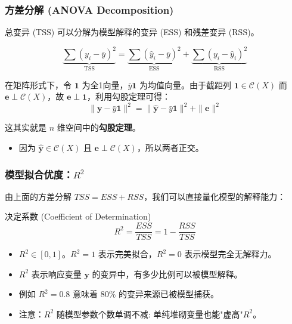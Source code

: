 
\begin{frame}
\frametitle{方差分解 (ANOVA Decomposition)}

总变异 (TSS) 可以分解为模型解释的变异 (ESS) 和残差变异 (RSS)。

\[
\underbrace{\sum (y_i - \bar{y})^2}_{\text{TSS}} = \underbrace{\sum (\hat{y}_i - \bar{y})^2}_{\text{ESS}} + \underbrace{\sum (y_i - \hat{y}_i)^2}_{\text{RSS}}
\]

在矩阵形式下，令 $\mathbf{1}$ 为全1向量，$\bar{y}\mathbf{1}$ 为均值向量。由于截距列 $\mathbf{1} \in \mathcal{C}(X)$ 而 $\mathbf{e} \perp \mathcal{C}(X)$，故 $\mathbf{e} \perp \mathbf{1}$，利用勾股定理可得：
\[
\|\mathbf{y} - \bar{y}\mathbf{1}\|^2 = \|\hat{\mathbf{y}} - \bar{y}\mathbf{1}\|^2 + \|\mathbf{e}\|^2
\]

这其实就是 $n$ 维空间中的\textbf{勾股定理}。
\begin{itemize}
    \item 因为 $\hat{\mathbf{y}} \in \mathcal{C}(X)$ 且 $\mathbf{e} \perp \mathcal{C}(X)$，所以两者正交。
\end{itemize}

\end{frame}


\begin{frame}
\frametitle{模型拟合优度：$R^2$}

由上面的方差分解 $TSS = ESS + RSS$，我们可以直接量化模型的解释能力：

\begin{block}{决定系数 (Coefficient of Determination)}
\[
R^2 = \frac{ESS}{TSS} = 1 - \frac{RSS}{TSS}
\]
\end{block}

\begin{itemize}
    \item $R^2 \in [0, 1]$。$R^2 = 1$ 表示完美拟合，$R^2 = 0$ 表示模型完全无解释力。
    \item $R^2$ 表示响应变量 $\mathbf{y}$ 的变异中，有多少比例可以被模型解释。
    \item 例如 $R^2 = 0.8$ 意味着 $80\%$ 的变异来源已被模型捕获。
    \item 注意：$R^2$ 随模型参数个数单调不减: 单纯堆砌变量也能"虚高"$R^2$。
\end{itemize}

\end{frame}

